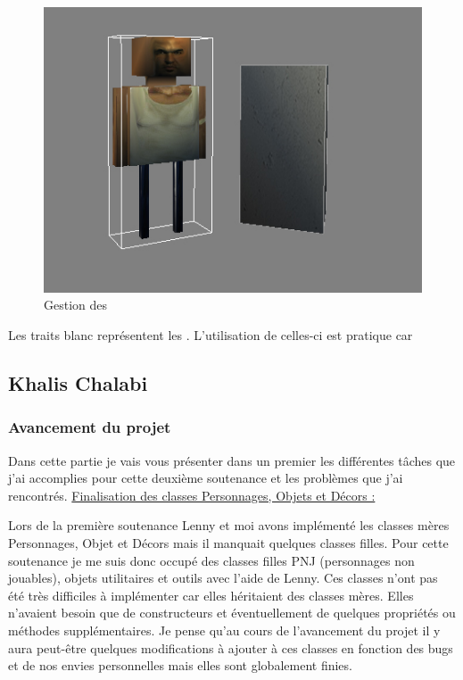 \documentclass{article}
\begin{document}
\begin{figure}[h]
\begin{center}
\includegraphics[scale=0.7]{BoundingBox.jpg}
\caption{Gestion des }
\end{center}
\end{figure}

Les traits blanc représentent les . L'utilisation de celles-ci est pratique car 

\newpage

\subsection{Khalis Chalabi}

\subsubsection{Avancement du projet}

\par
Dans cette partie je vais vous présenter dans un premier les différentes tâches que j'ai accomplies pour cette deuxième  soutenance et les problèmes que j'ai rencontrés.
\newline
\newline
\underline{Finalisation des classes Personnages, Objets et Décors :}

\par
Lors de la première soutenance Lenny et moi avons implémenté les classes mères Personnages, Objet et Décors mais il manquait quelques classes filles. Pour cette soutenance je me suis donc occupé des classes filles PNJ (personnages non jouables), objets utilitaires et outils avec l’aide de Lenny. Ces classes n’ont pas été très difficiles à implémenter car elles héritaient des classes mères. Elles n’avaient besoin que de constructeurs et éventuellement de quelques propriétés ou méthodes supplémentaires. Je pense qu’au cours de l’avancement du projet il y aura peut-être quelques modifications à ajouter à ces classes en fonction des bugs et de nos envies personnelles mais elles sont globalement finies.
\end{document}
